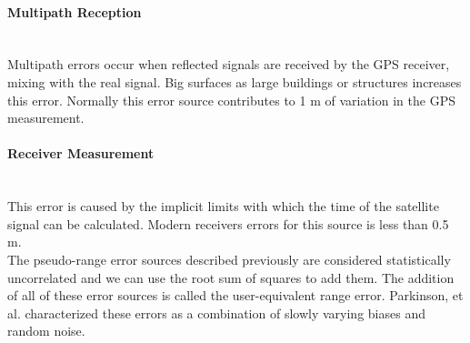 \paragraph{Multipath Reception} \hspace{0pt} \\
Multipath errors occur when reflected signals are received by the GPS receiver, mixing with the real signal. Big surfaces as large buildings or structures increases this error. Normally this error source contributes to 1 m of variation in the GPS measurement.

\paragraph{Receiver Measurement} \hspace{0pt} \\
This error is caused by the implicit limits with which the time of the satellite signal can be calculated. Modern receivers errors for this source is less than 0.5 m. \\

The pseudo-range error sources described previously are considered statistically uncorrelated and we can use the root sum of squares to add them. The addition of all of these error sources is called the user-equivalent range error. Parkinson, et al. \cite{Parkinson1996} characterized these errors as a combination of slowly varying biases and random noise.

